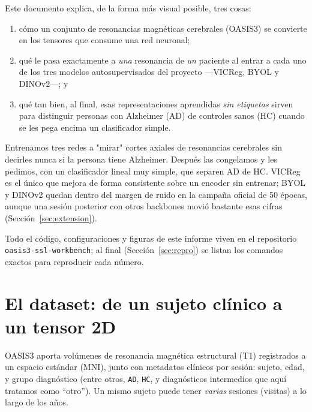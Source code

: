 \documentclass[11pt,a4paper]{article}
\begin{document}
Este documento explica, de la forma más visual posible, tres cosas:

\begin{enumerate}
\item cómo un conjunto de resonancias magnéticas cerebrales (OASIS3) se convierte
  en los tensores que consume una red neuronal;
\item qué le pasa exactamente a \emph{una} resonancia de \emph{un} paciente al
  entrar a cada uno de los tres modelos autosupervisados del proyecto —VICReg,
  BYOL y DINOv2—; y
\item qué tan bien, al final, esas representaciones aprendidas \emph{sin
  etiquetas} sirven para distinguir personas con Alzheimer (AD) de controles
  sanos (HC) cuando se les pega encima un clasificador simple.
\end{enumerate}

\begin{tldrbox}
Entrenamos tres redes a "mirar" cortes axiales de resonancias cerebrales sin
decirles nunca si la persona tiene Alzheimer. Después las congelamos y les
pedimos, con un clasificador lineal muy simple, que separen AD de HC. VICReg
es el único que mejora de forma consistente sobre un encoder sin entrenar;
BYOL y DINOv2 quedan dentro del margen de ruido en la campaña oficial de 50
épocas, aunque una sesión posterior con otros backbones movió bastante esas
cifras (Sección~\ref{sec:extension}).
\end{tldrbox}

Todo el código, configuraciones y figuras de este informe viven en el
repositorio \texttt{oasis3-ssl-workbench}; al final (Sección~\ref{sec:repro})
se listan los comandos exactos para reproducir cada número.

\section{El dataset: de un sujeto clínico a un tensor 2D}
\label{sec:data}

OASIS3 aporta volúmenes de resonancia magnética estructural (T1) registrados
a un espacio estándar (MNI), junto con metadatos clínicos por sesión: sujeto,
edad, y grupo diagnóstico (entre otros, \texttt{AD}, \texttt{HC}, y
diagnósticos intermedios que aquí tratamos como ``otro''). Un mismo sujeto
puede tener \emph{varias} sesiones (visitas) a lo largo de los años.
\end{document}
